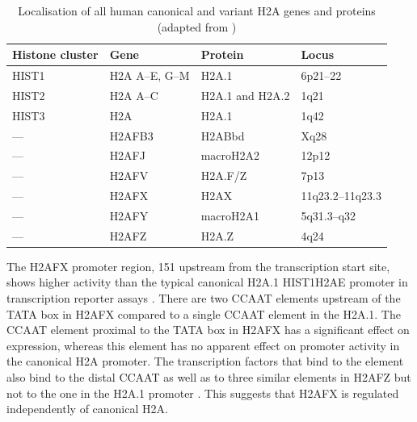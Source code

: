 \begin{table}
\centering
\caption[Localisation of all human canonical and variant H2A genes and
         proteins]%
        {Localisation of all human canonical and variant H2A genes and
          proteins (adapted from \citet{Marzluff02})}
\label{tab:h2ax-review:H2A-localisation}
\begin{tabular}{l l l l}
\toprule
Histone cluster & Gene & Protein & Locus  \\
\midrule
HIST1 & H2A A--E, G--M  & H2A.1           & 6p21--22\\
HIST2 & H2A A--C        & H2A.1 and H2A.2 & 1q21\\
HIST3 & H2A             & H2A.1           & 1q42\\
---   & H2AFB3          & H2ABbd          & Xq28\\
---   & H2AFJ           & macroH2A2       & 12p12\\
---   & H2AFV           & H2A.F/Z         & 7p13\\
---   & H2AFX           & H2AX            & 11q23.2--11q23.3\\
---   & H2AFY           & macroH2A1       & 5q31.3--q32\\
---   & H2AFZ           & H2A.Z           & 4q24\\
\bottomrule
\end{tabular}
\end{table}

The H2AFX promoter region, \SI{151}{\bp} upstream from the
transcription start site, shows higher activity than the typical
canonical H2A.1 HIST1H2AE promoter in transcription reporter assays
\citep{VSI94}.  There are two CCAAT elements upstream of the TATA box
in H2AFX  compared to a single CCAAT
element in the H2A.1. The CCAAT element proximal to the TATA box in
H2AFX has a significant effect on expression, whereas this element has
no apparent effect on promoter activity in the canonical H2A
promoter. The transcription factors that bind to the element also bind
to the distal CCAAT as well as to three similar elements in H2AFZ but
not to the one in the H2A.1 promoter \citep{VSI94}.
This suggests that H2AFX is regulated independently of canonical H2A.

